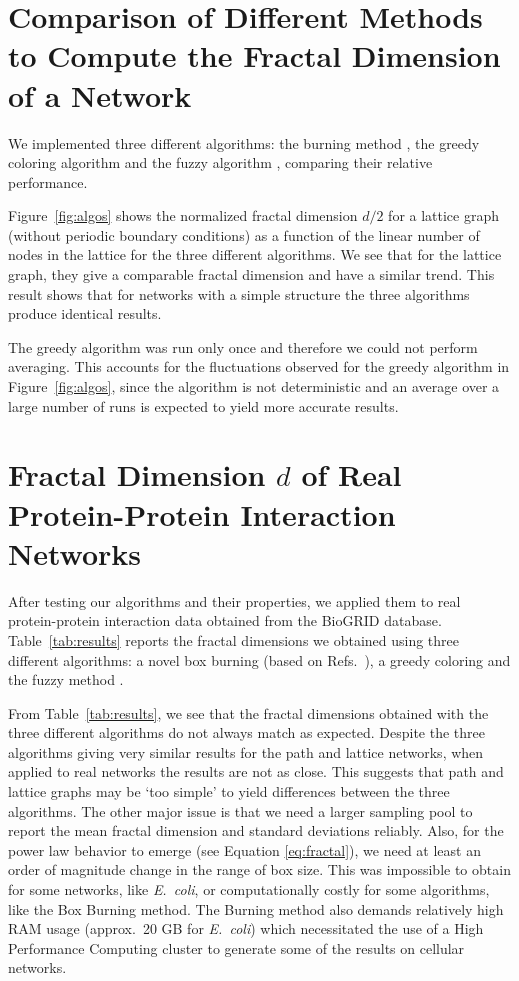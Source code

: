 \documentclass[9pt,onecolumn,twoside]{pnas-new}
\begin{document}
\section*{Comparison of Different Methods to Compute the Fractal Dimension of a Network}
We implemented three different algorithms:  the burning method \cite{song2004,concas2006,song2007}, the greedy coloring algorithm \cite{song2007} and the fuzzy algorithm \cite{zhang2014}, comparing their relative performance.

Figure~\ref{fig:algos} shows the normalized fractal dimension $d/2$ for a lattice graph (without periodic boundary conditions) as a function of the linear number of nodes in the lattice for the three different algorithms. We see that for the lattice graph, they give a comparable fractal dimension and have a similar trend. This result shows that for networks with a simple structure the three algorithms produce identical results.

The greedy algorithm was run only once and therefore we could not perform averaging. This accounts for the fluctuations observed for the greedy algorithm in Figure~\ref{fig:algos}, since the algorithm is not deterministic \cite{song2007} and an average over a large number of runs is expected to yield more accurate results.

\section*{Fractal Dimension $d$ of Real Protein-Protein Interaction Networks}
After testing our algorithms and their properties, we applied them to real protein-protein interaction data obtained from the BioGRID database. Table~\ref{tab:results} reports the fractal dimensions we obtained using three different algorithms: a novel box burning (based on Refs.~\cite{song2004,concas2006,song2007}), a greedy coloring \cite{song2007} and the fuzzy method \cite{zhang2014}.

From Table~\ref{tab:results}, we see that the fractal dimensions obtained with the three different algorithms do not always match as expected. Despite the three algorithms giving very similar results for the path and lattice networks, when applied to real networks the results are not as close. This suggests that path and lattice graphs may be `too simple' to yield differences between the three algorithms. The other major issue is that we need a larger sampling pool to report the mean fractal dimension and standard deviations reliably. Also, for the power law behavior to emerge (see Equation \ref{eq:fractal}), we need at least an order of magnitude change in the range of box size. This was impossible to obtain for some networks, like \textit{E.\ coli}, or computationally costly for some algorithms, like the Box Burning method. The Burning method also demands relatively high RAM usage (approx.\ 20 GB for \emph{E.\ coli}) which necessitated the use of a High Performance Computing cluster to generate some of the results on cellular networks.
\end{document}
